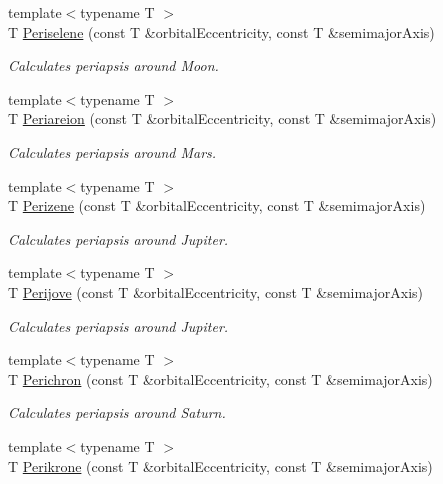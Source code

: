 \begin{DoxyCompactItemize}
{\footnotesize template$<$typename T $>$ }\\T \hyperlink{group___periapsis_ga255874374dde571531e443cdbef9ef0c}{Periselene} (const T \&orbital\+Eccentricity, const T \&semimajor\+Axis)
\begin{DoxyCompactList}\small\item\em Calculates periapsis around Moon. \end{DoxyCompactList}\item 
{\footnotesize template$<$typename T $>$ }\\T \hyperlink{group___periapsis_ga0617ba07a30b0fd0544c02f691bfae26}{Periareion} (const T \&orbital\+Eccentricity, const T \&semimajor\+Axis)
\begin{DoxyCompactList}\small\item\em Calculates periapsis around Mars. \end{DoxyCompactList}\item 
{\footnotesize template$<$typename T $>$ }\\T \hyperlink{group___periapsis_ga0523c65b7fc26e675388b2c3d38aa00b}{Perizene} (const T \&orbital\+Eccentricity, const T \&semimajor\+Axis)
\begin{DoxyCompactList}\small\item\em Calculates periapsis around Jupiter. \end{DoxyCompactList}\item 
{\footnotesize template$<$typename T $>$ }\\T \hyperlink{group___periapsis_ga075052f7ff9aa1d5fdf4501b493be86b}{Perijove} (const T \&orbital\+Eccentricity, const T \&semimajor\+Axis)
\begin{DoxyCompactList}\small\item\em Calculates periapsis around Jupiter. \end{DoxyCompactList}\item 
{\footnotesize template$<$typename T $>$ }\\T \hyperlink{group___periapsis_ga12b5e99aa2e3e7031ef6ce93060cf516}{Perichron} (const T \&orbital\+Eccentricity, const T \&semimajor\+Axis)
\begin{DoxyCompactList}\small\item\em Calculates periapsis around Saturn. \end{DoxyCompactList}\item 
{\footnotesize template$<$typename T $>$ }\\T \hyperlink{group___periapsis_gaa56f74c44a3583b8f0d13b821c1d7422}{Perikrone} (const T \&orbital\+Eccentricity, const T \&semimajor\+Axis)

\end{DoxyCompactItemize}
